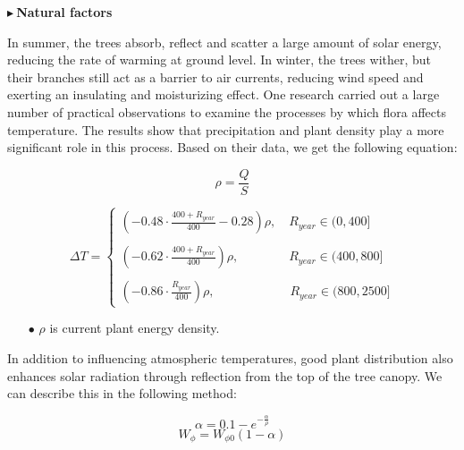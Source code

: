 \documentclass[12pt]{article}  %
\newenvironment{shrinkeq}[1]
{ \bgroup
	\addtolength\abovedisplayshortskip{#1}
	\addtolength\abovedisplayskip{#1}
	\addtolength\belowdisplayshortskip{#1}
	\addtolength\belowdisplayskip{#1}}
{\egroup\ignorespacesafterend}
\begin{document}
\noindent$\blacktriangleright\ $\textbf{\small{Natural factors }}

In summer, the trees absorb, reflect and scatter a large amount of solar energy, reducing the rate of warming at ground level. In winter, the trees wither, but their branches still act as a barrier to air currents, reducing wind speed and exerting an insulating and moisturizing effect{\cite{1}}.
One research{\cite{9}} carried out a large number of practical observations to examine the processes by which flora affects temperature. The results show that precipitation and plant density play a more significant role in this process. Based on their data, we get the following equation:

\begin{shrinkeq}{-1ex}
	\begin{equation}
    \label{eq:eq11}
    \rho=\frac{Q}{S}
	\end{equation}
\end{shrinkeq}


\begin{shrinkeq}{-1ex}
	\begin{equation}
    \label{eq:eq12}
    \varDelta T=
    \left\{\begin{array}{l}
	(-0.48\cdot\frac{400+R_{year}}{400}-0.28)\rho, \quad R_{year}\in(0,400]\\
 \\
    (-0.62\cdot\frac{400+R_{year}}{400})\rho,     \qquad \qquad R_{year}\in(400,800]\\
\\   
    (-0.86\cdot\frac{R_{year}}{400})\rho,       \qquad  \qquad \qquad R_{year}\in(800,2500]
    \end{array}\right.
	\end{equation}
\end{shrinkeq}

\begin{itemize}
\vspace{-0.2cm}
\item[$\bullet$] \textbf{$\rho$ }is current plant energy density.
\end{itemize}

\vspace{-0.2cm}
In addition to influencing atmospheric temperatures, good plant distribution also enhances solar radiation through reflection from the top of the tree canopy{\cite{9}}. We can describe this in the following method: 

\begin{shrinkeq}{-1ex}
	\begin{equation}
    \label{eq:eq13}
    \alpha=0.1-e^{-\frac{\alpha }{\rho}} 
	\end{equation}
\end{shrinkeq}
\begin{shrinkeq}{-1ex}
	\begin{equation}
    \label{eq:eq14}
    W_\phi=W_{\phi 0}(1-\alpha)
	\end{equation}
\end{shrinkeq}
\end{document}
